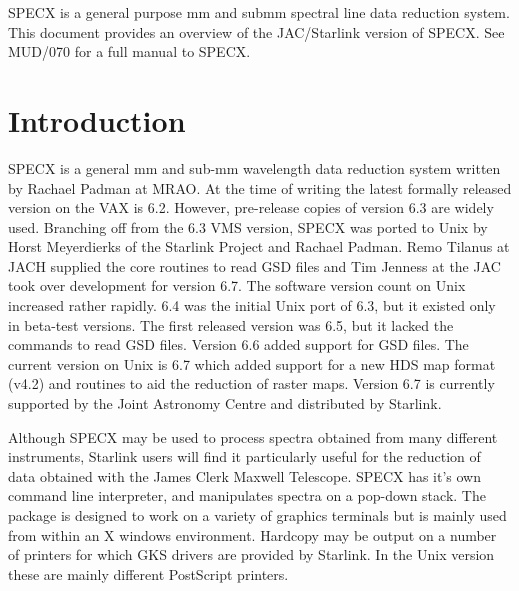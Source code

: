 \documentclass[twoside,11pt]{article}
\newcommand{\stardocinitials}  {SUN}
\newcommand{\stardocnumber}    {17.8}
\newcommand{\stardocabstract}  {SPECX is a general purpose mm and submm
spectral line data reduction system. This document provides an overview
of the JAC/Starlink version of SPECX. See MUD/070 for a full manual to
SPECX.}
\newcommand{\stardocname}{\stardocinitials /\stardocnumber}
\newcommand{\htmladdnormallink}[2]{#1}
\newenvironment{latexonly}{}{}
\newcommand{\xref}[3]{#1}
\renewcommand{\_}{\texttt{\symbol{95}}}
\renewcommand{\thepage}{\roman{page}}
\begin{document}
\stardocabstract
  \newpage
  \begin{latexonly}
    \setlength{\parskip}{0mm}
    \tableofcontents
    \setlength{\parskip}{\medskipamount}
    \markboth{\stardocname}{\stardocname}
  \end{latexonly}
\cleardoublepage
\renewcommand{\thepage}{\arabic{page}}
\setcounter{page}{1}

\section {Introduction}

SPECX is a general mm and sub-mm wavelength data reduction system written by
Rachael Padman at \htmladdnormallink{MRAO}{http://www.mrao.cam.ac.uk}. At the
time of writing the latest formally released version on the VAX is 6.2.
However, pre-release copies of version 6.3 are widely used. Branching off from
the 6.3 VMS version, SPECX was ported to Unix by Horst Meyerdierks of the
\htmladdnormallink{Starlink Project}{http://www.starlink.rl.ac.uk} and Rachael
Padman. Remo Tilanus at JACH supplied the core routines to read GSD files and
Tim Jenness at the JAC took over development for version 6.7. The software
version count on Unix increased rather rapidly. 6.4 was the initial Unix port
of 6.3, but it existed only in beta-test versions. The first released version
was 6.5, but it lacked the commands to read \xref{GSD}{sun229}{} files.
Version 6.6 added support for \xref{GSD}{sun229}{} files. The current version
on Unix is 6.7 which added support for a new \xref{HDS}{sun92}{} map format
(v4.2) and routines to aid the reduction of raster maps. Version 6.7 is
currently supported by the Joint Astronomy Centre and distributed by Starlink.

Although SPECX may be used to process spectra obtained from many different
instruments, Starlink users will find it particularly useful for the reduction
of data obtained with the James Clerk Maxwell Telescope.  SPECX has it's own
command line interpreter, and manipulates spectra on a pop-down stack.  The
package is designed to work on a variety of graphics terminals but is mainly
used from within an X windows environment. Hardcopy may be output on a number
of printers for which \xref{GKS}{sun83}{} drivers are provided by Starlink. In
the Unix version these are mainly different PostScript printers.
\end{document}
